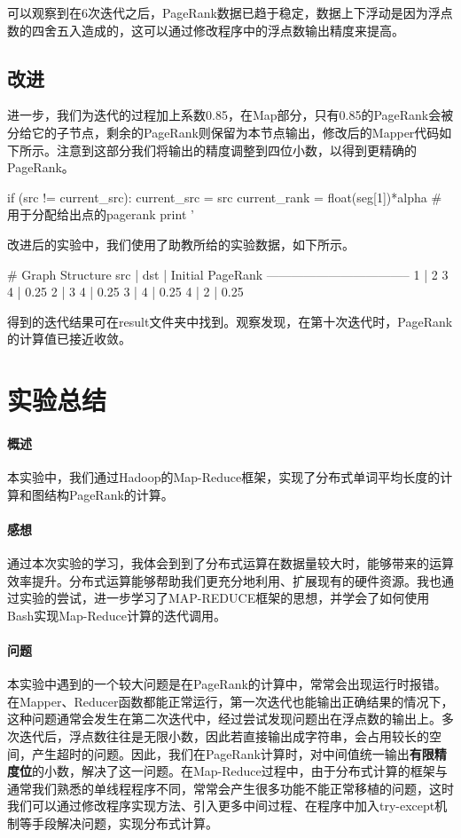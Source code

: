 \documentclass{article}
\begin{document}
可以观察到在6次迭代之后，PageRank数据已趋于稳定，数据上下浮动是因为浮点数的四舍五入造成的，这可以通过修改程序中的浮点数输出精度来提高。

\subsection{改进}
进一步，我们为迭代的过程加上系数0.85，在Map部分，只有0.85的PageRank会被分给它的子节点，剩余的PageRank则保留为本节点输出，修改后的Mapper代码如下所示。注意到这部分我们将输出的精度调整到四位小数，以得到更精确的PageRank。
\begin{python}
if (src != current_src):
   current_src = src
   current_rank = float(seg[1])*alpha                # 用于分配给出点的pagerank
   print '%
\end{python}

改进后的实验中，我们使用了助教所给的实验数据，如下所示。

\begin{python}
# Graph Structure
src | dst      | Initial PageRank
-----------------------------------
 1  | 2 3 4    | 0.25
 2  | 3 4      | 0.25
 3  | 4        | 0.25
 4  | 2        | 0.25
\end{python}

得到的迭代结果可在result文件夹中找到。观察发现，在第十次迭代时，PageRank的计算值已接近收敛。

\section{实验总结}
\paragraph{概述}
本实验中，我们通过Hadoop的Map-Reduce框架，实现了分布式单词平均长度的计算和图结构PageRank的计算。

\paragraph{感想}
通过本次实验的学习，我体会到到了分布式运算在数据量较大时，能够带来的运算效率提升。分布式运算能够帮助我们更充分地利用、扩展现有的硬件资源。我也通过实验的尝试，进一步学习了MAP-REDUCE框架的思想，并学会了如何使用Bash实现Map-Reduce计算的迭代调用。

\paragraph{问题}
本实验中遇到的一个较大问题是在PageRank的计算中，常常会出现运行时报错。在Mapper、Reducer函数都能正常运行，第一次迭代也能输出正确结果的情况下，这种问题通常会发生在第二次迭代中，经过尝试发现问题出在浮点数的输出上。多次迭代后，浮点数往往是无限小数，因此若直接输出成字符串，会占用较长的空间，产生超时的问题。因此，我们在PageRank计算时，对中间值统一输出\textbf{有限精度位}的小数，解决了这一问题。在Map-Reduce过程中，由于分布式计算的框架与通常我们熟悉的单线程程序不同，常常会产生很多功能不能正常移植的问题，这时我们可以通过修改程序实现方法、引入更多中间过程、在程序中加入try-except机制等手段解决问题，实现分布式计算。
\end{document}
